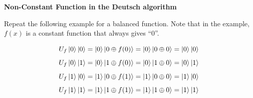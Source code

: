 \documentclass[a4paper, 10pt]{article}
\begin{document}
\begin{problem}
\textbf{Non-Constant Function in the Deutsch algorithm}
\par Repeat the following example for a balanced function.
Note that in the example, \( f(x) \) is a constant function that always gives ``0''.

\[ U_f \ket{0}\ket{0} = \ket{0}\ket{0 \oplus f(0)} = \ket{0}\ket{0 \oplus 0} = \ket{0}\ket{0} \]
\[ U_f \ket{0}\ket{1} = \ket{0}\ket{1 \oplus f(0)} = \ket{0}\ket{1 \oplus 0} = \ket{0}\ket{1} \]
\[ U_f \ket{1}\ket{0} = \ket{1}\ket{0 \oplus f(1)} = \ket{1}\ket{0 \oplus 0} = \ket{1}\ket{0} \]
\[ U_f \ket{1}\ket{1} = \ket{1}\ket{1 \oplus f(1)} = \ket{1}\ket{1 \oplus 0} = \ket{1}\ket{1} \]
\end{problem}
\end{document}
